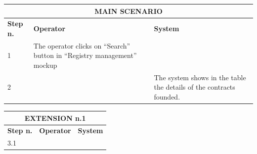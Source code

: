 {{{\begin{table}[h]
\begin{tabular}{|p{4cm}|p{10cm}|}
			\hline
			\end{tabular}
			\end{table}
			\begin{table}[h]
			\begin{tabular}{|p{2cm}|p{6cm}|p{6cm}|}
			\hline
				\multicolumn{3}{|c|}{MAIN SCENARIO} \\
			\hline
				\centering \vspace{1mm} \bfseries{Step n.} \vspace{1mm} & \vspace{1mm} \bfseries{Operator} \vspace{1mm} & \vspace{1mm} \bfseries{System} \vspace{1mm}\\
			\hline
				\vspace{1mm} 1 \vspace{1mm} &
				\vspace{1mm} The operator clicks on “Search” button in “Registry management”  mockup \vspace{1mm} & 
				\vspace{1mm} \vspace{1mm} \\
			\hline
				\vspace{1mm} 2 \vspace{1mm} &
				\vspace{1mm} \vspace{1mm} & 
				\vspace{1mm} The system shows in the table the details of the contracts founded. \vspace{1mm} \\
			\hline
			\end{tabular}
			\end{table}
			\begin{table}[h]
			\begin{tabular}{|p{2cm}|p{6cm}|p{6cm}|}
			\hline
				\multicolumn{3}{|c|}{EXTENSION n.1} \\
			\hline
				\centering \vspace{1mm} \bfseries{Step n.} \vspace{1mm} & \vspace{1mm} \bfseries{Operator} \vspace{1mm} & \vspace{1mm} \bfseries{System} \vspace{1mm}\\
			\hline
				\vspace{1mm} 3.1 \vspace{1mm} &

\end{tabular}
\end{table}}}}
